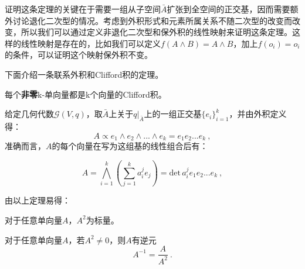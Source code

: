 证明这条定理的关键在于需要一组从子空间$\bar A$扩张到全空间的正交基，因而需要额外讨论退化二次型的情况。考虑到外积形式和元素所属关系不随二次型的改变而改变，所以我们可以通过定义非退化二次型和保外积的线性映射来证明这条定理。这样的线性映射是存在的，比如我们可以定义$f(A\wedge B)=A\wedge B$，加上$f(o_i)=o_i$的条件，可以证明这个映射保外积不变。

下面介绍一条联系外积和Clifford积的定理。
\begin{theorem}{}
每个\textbf{非零}k-单向量都是k个向量的Clifford积。
\end{theorem}
给定几何代数$\mathcal G(V,q)$，取$\bar A$上关于$q|_{\bar A}$上的一组正交基$\{e_i\}^k_{i=1}$，并由外积定义得：
\begin{equation}
A\propto e_1\wedge e_2\wedge...\wedge e_k=e_1e_2...e_k~,
\end{equation}
准确而言，$A$的每个向量在写为这组基的线性组合后有：

\begin{equation}
A=\bigwedge ^k_{i=1}\left(\sum^k_{j=1}a^j_ie_j\right)=\mathrm{det}\,a^j_ie_1 e_2...e_k~,
\end{equation}

由以上定理易得：
\begin{corollary}{}
对于任意单向量$A$，$A^2$为标量。
\end{corollary}
\begin{corollary}{}
对于任意单向量$A$，若$A^2\neq 0$，则$A$有逆元
\begin{equation}
A^{-1}=\frac{A}{A^2}~.
\end{equation}
\end{corollary}
